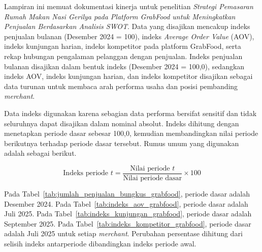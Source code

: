 \label{app:dokumentasi-indeks-kinerja}

Lampiran ini memuat dokumentasi kinerja untuk penelitian \textit{Strategi Pemasaran Rumah Makan Nasi Gerilya pada Platform GrabFood untuk Meningkatkan Penjualan Berdasarkan Analisis SWOT}. Data yang disajikan mencakup indeks penjualan bulanan (Desember 2024 = 100), indeks \textit{Average Order Value} (AOV), indeks kunjungan harian, indeks kompetitor pada platform GrabFood, serta rekap hubungan pengalaman pelanggan dengan penjualan. Indeks penjualan bulanan disajikan dalam bentuk indeks (Desember 2024 = 100,0), sedangkan indeks AOV, indeks kunjungan harian, dan indeks kompetitor disajikan sebagai data turunan untuk membaca arah performa usaha dan posisi pembanding \textit{merchant}.

Data indeks digunakan karena sebagian data performa bersifat sensitif dan tidak seluruhnya dapat disajikan dalam nominal absolut. Indeks dihitung dengan menetapkan periode dasar sebesar 100,0, kemudian membandingkan nilai periode berikutnya terhadap periode dasar tersebut. Rumus umum yang digunakan adalah sebagai berikut.

\[
    \mbox{Indeks periode } t = \frac{\mbox{Nilai periode } t}{\mbox{Nilai periode dasar}} \times 100
\]

Pada Tabel~\ref{tab:jumlah_penjualan_bungkus_grabfood}, periode dasar adalah Desember 2024. Pada Tabel~\ref{tab:indeks_aov_grabfood}, periode dasar adalah Juli 2025. Pada Tabel~\ref{tab:indeks_kunjungan_grabfood}, periode dasar adalah September 2025. Pada Tabel~\ref{tab:indeks_kompetitor_grabfood}, periode dasar adalah Juli 2025 untuk setiap \textit{merchant}. Perubahan persentase dihitung dari selisih indeks antarperiode dibandingkan indeks periode awal.

